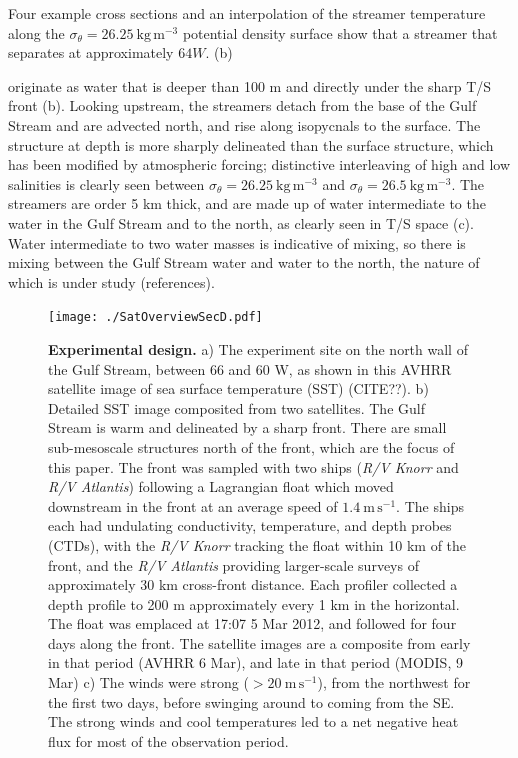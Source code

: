 \documentclass{ametsoc}
\begin{document}
Four example cross sections and an interpolation of the streamer temperature along the $\sigma_{\theta}=26.25\ \mathrm{kg\,m^{-3}}$ potential density surface show that a streamer that separates at approximately $64 W$. (b)


originate as water that is deeper than 100 m and directly under the sharp T/S front (b).  Looking upstream, the streamers detach from the base of the Gulf Stream and are advected north, and rise along isopycnals to the surface.  The structure at depth is more sharply delineated than the surface structure, which has been modified by atmospheric forcing; distinctive interleaving of high and low salinities is clearly seen between $\sigma_{\theta}=26.25\ \mathrm{kg\,m^{-3}}$ and $\sigma_{\theta}=26.5\ \mathrm{kg\,m^{-3}}$.  The streamers are order 5 km thick, and are made up of water intermediate to the water in the Gulf Stream and to the north, as clearly seen in T/S space (c).  Water intermediate to two water masses is indicative of mixing, so there is mixing between the Gulf Stream water and water to the north, the nature of which is under study (references).










\begin{figure}[htbp]
  \centering
    \texttt{[image: ./SatOverviewSecD.pdf]}
   \caption{{\bf Experimental design.}  a) The experiment site on the north wall of the Gulf Stream, between 66 and 60 W, as shown in this AVHRR satellite image of sea surface temperature (SST) (CITE??).  b) Detailed SST image composited from two satellites.  The Gulf Stream is warm and delineated by a sharp front.  There are small sub-mesoscale structures north of the front, which are the focus of this paper.  The front was sampled with two ships (\emph{R/V Knorr} and \emph{R/V Atlantis}) following a Lagrangian float \cite{dasarolien00a,dasaroetal11} which moved downstream in the front at an average speed of $1.4\ \mathrm{m\,s^{-1}}$. The ships each had undulating conductivity, temperature, and depth probes (CTDs), with the \emph{R/V Knorr} tracking the float within 10 km of the front, and the \emph{R/V Atlantis} providing larger-scale surveys of approximately 30 km cross-front distance.  Each profiler collected a depth profile to 200 m approximately every 1 km in the horizontal.  The float was emplaced at 17:07 5 Mar 2012, and followed for four days along the front. The satellite images are a composite from early in that period (AVHRR 6 Mar), and late in that period (MODIS, 9 Mar) c) The winds were strong ($>20\ \mathrm{m\,s^{-1}}$), from the northwest for the first two days, before swinging around to coming from the SE.  The strong winds and cool temperatures led to a net negative heat flux for most of the observation period. \label{fig:SatOverviewSectD} }
\end{figure}
\end{document}
